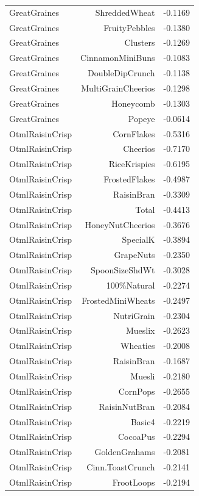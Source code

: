 \begin{longtable}{@{}lrr@{}}
GreatGraines & ShreddedWheat & -0.1169 \\
GreatGraines & FruityPebbles & -0.1380 \\
GreatGraines & Clusters & -0.1269 \\
GreatGraines & CinnamonMiniBuns & -0.1083 \\
GreatGraines & DoubleDipCrunch & -0.1138 \\
GreatGraines & MultiGrainCheerios & -0.1298 \\
GreatGraines & Honeycomb & -0.1303 \\
GreatGraines & Popeye & -0.0614 \\
OtmlRaisinCrisp & CornFlakes & -0.5316 \\
OtmlRaisinCrisp & Cheerios & -0.7170 \\
OtmlRaisinCrisp & RiceKrispies & -0.6195 \\
OtmlRaisinCrisp & FrostedFlakes & -0.4987 \\
OtmlRaisinCrisp & RaisinBran & -0.3309 \\
OtmlRaisinCrisp & Total & -0.4413 \\
OtmlRaisinCrisp & HoneyNutCheerios & -0.3676 \\
OtmlRaisinCrisp & SpecialK & -0.3894 \\
OtmlRaisinCrisp & GrapeNuts & -0.2350 \\
OtmlRaisinCrisp & SpoonSizeShdWt & -0.3028 \\
OtmlRaisinCrisp & 100\%Natural & -0.2274 \\
OtmlRaisinCrisp & FrostedMiniWheats & -0.2497 \\
OtmlRaisinCrisp & NutriGrain & -0.2304 \\
OtmlRaisinCrisp & Mueslix & -0.2623 \\
OtmlRaisinCrisp & Wheaties & -0.2008 \\
OtmlRaisinCrisp & RaisinBran & -0.1687 \\
OtmlRaisinCrisp & Muesli & -0.2180 \\
OtmlRaisinCrisp & CornPops & -0.2655 \\
OtmlRaisinCrisp & RaisinNutBran & -0.2084 \\
OtmlRaisinCrisp & Basic4 & -0.2219 \\
OtmlRaisinCrisp & CocoaPus & -0.2294 \\
OtmlRaisinCrisp & GoldenGrahams & -0.2081 \\
OtmlRaisinCrisp & Cinn.ToastCrunch & -0.2141 \\
OtmlRaisinCrisp & FrootLoops & -0.2194 \\

\end{longtable}
